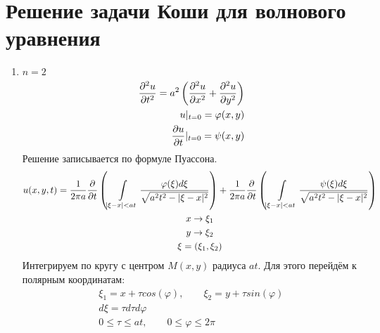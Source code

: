 \documentclass[../main.tex]{subfiles}
\begin{document}
\section{Решение задачи Коши для волнового уравнения}
\begin{enumerate}
    \item $n=2$
\begin{equation}
    \label{eq:2.7.1}
    \begin{split}
    \frac{\partial ^2u}{\partial t^2} = a^2\left(\frac{\partial ^2u}{\partial x^2}+\frac{\partial ^2u}{\partial y^2}\right)\\
    u|_{t=0} = \varphi(x,y)\\
    \frac{\partial u}{\partial t}|_{t=0} = \psi(x,y)
    \end{split}
\end{equation}
Решение записывается по формуле Пуассона.
\begin{gather*}
    u(x,y,t) = \frac{1}{2\pi a}\frac{\partial  }{\partial t}\left(
    \int\displaylimits_{|\xi-x|<at} \frac{\varphi(\xi)d\xi}{\sqrt{a^2t^2 - |\xi-x|^2}}\right)
    +
    \frac{1}{2\pi a}\frac{\partial  }{\partial t}\left(
    \int\displaylimits_{|\xi-x|<at} \frac{\psi(\xi)d\xi}{\sqrt{a^2t^2 - |\xi-x|^2}}\right)\\
    x \rightarrow \xi_1\\
    y \rightarrow \xi_2\\
    \xi = (\xi_1,\xi_2)
\end{gather*}
Интегрируем по кругу с центром $M(x,y)$ радиуса $at$. Для этого перейдём к
полярным координатам:
\begin{gather*}
    \xi_1 = x + \tau cos(\varphi), \qquad \xi_2 = y + \tau sin(\varphi)\\
    d\xi = \tau d\tau d\varphi \\
    0 \leq \tau \leq at, \qquad 0 \leq \varphi \leq 2\pi
\end{gather*}


\end{enumerate}
\end{document}
